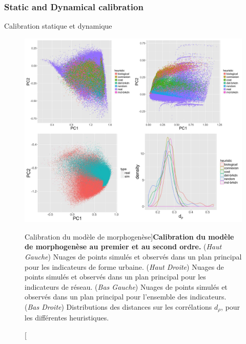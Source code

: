 \subsubsection{Static and Dynamical calibration}{Calibration statique et dynamique}




\begin{figure}
	\includegraphics[width=\linewidth]{Figures/Final/7-2-2-fig-mesocoevolmodel-calibration.jpg}
	\caption[Morphogenesis model calibration][Calibration du modèle de morphogenèse]{\label{fig:mesocoevolmodel:calibration}}{\textbf{Calibration du modèle de morphogenèse au premier et au second ordre.} (\textit{Haut Gauche}) Nuages de points simulés et observés dans un plan principal pour les indicateurs de forme urbaine. (\textit{Haut Droite}) Nuages de points simulés et observés dans un plan principal pour les indicateurs de réseau. (\textit{Bas Gauche}) Nuages de points simulés et observés dans un plan principal pour l'ensemble des indicateurs. (\textit{Bas Droite}) Distributions des distances sur les corrélations $d_{\rho}$, pour les différentes heuristiques.\label{fig:mesocoevolmodel:calibration}}
\end{figure}


